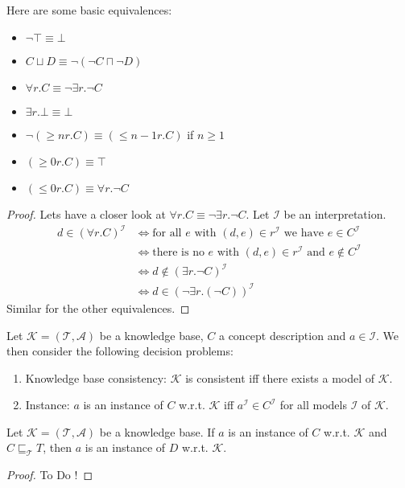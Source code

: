 \begin{lemma}
	Here are some basic equivalences:
	\begin{itemize}
		\item $\neg \top \equiv \bot$
		\item $C \sqcup D \equiv \neg \left( \neg C \sqcap \neg D \right)$
		\item $\forall r.C \equiv \neg \exists r.\neg C$
		\item $\exists r.\bot \equiv \bot$
		\item $\neg \left( \geq nr.C \right) \equiv \left( \leq n-1 r.C \right)$ if $n \geq 1$
		\item $\left( \geq 0 r.C \right) \equiv \top$
		\item $\left( \leq 0r.C \right) \equiv \forall r.\neg C$
	 \end{itemize}
\end{lemma}
\begin{proof}
	Lets have a closer look at $\forall r.C \equiv \neg \exists r.\neg C $.
	Let $\mathcal{I}$ be an interpretation.
	\begin{align*}
		d \in \left( \forall r.C \right)^{\mathcal{I}} & \iff \text{for all $e$ with $(d,e)\in r^{\mathcal{I}}$ we have $e \in C^{\mathcal{I}}$} \\
							& \iff \text{there is no $e$ with $(d,e)\in r^{\mathcal{I}}$ and $e \notin C^{\mathcal{I}}$} \\
							& \iff d  \notin \left( \exists r.\neg C \right)^{\mathcal{I}} \\
							& \iff d \in \left( \neg \exists r.(\neg C) \right)^{\mathcal{I}}
	\end{align*}
	Similar for the other equivalences. \qedhere
\end{proof}

\begin{definition}
	Let $\mathcal{K} = \left( \mathcal{T}, \mathcal{A} \right)$ be a knowledge base, 
	$C$ a concept description and $a \in \mathscr{I}$.
	We then consider the following decision problems:
	\begin{enumerate}
		\item Knowledge base consistency: $\mathcal{K}$ is consistent iff there exists a model of $\mathcal{K}$.
		\item Instance: $a$ is an instance of $C$ w.r.t. $\mathcal{K}$ iff $a^{\mathcal{I}} \in C^{\mathcal{I}}$ 
			for all models $\mathcal{I}$ of $\mathcal{K}$.
	\end{enumerate}
\end{definition}
\begin{lemma}
	Let $\mathcal{K} = \left( \mathcal{T}, \mathcal{A} \right)$ be a knowledge base.
	If $a$ is an instance of $C$ w.r.t. $\mathcal{K}$ and $C \sqsubseteq_{\mathcal{T}} T$,
	then $a$ is an instance of $D$ w.r.t. $\mathcal{K}$.
\end{lemma}
\begin{proof}
	To Do !
\end{proof}

